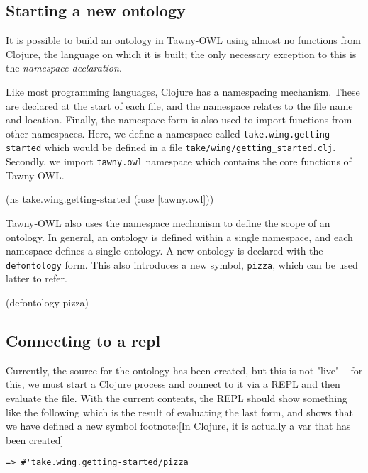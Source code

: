 \documentclass[11pt]{article}
\begin{document}
\subsection{Starting a new ontology}
\label{sec-4-2}

It is possible to build an ontology in Tawny-OWL using almost no
functions from Clojure, the language on which it is built; the only
necessary exception to this is the \emph{namespace declaration}.

Like most programming languages, Clojure has a namespacing mechanism.
These are declared at the start of each file, and the namespace relates
to the file name and location. Finally, the namespace form is also used
to import functions from other namespaces. Here, we define a namespace
called \texttt{take.wing.getting-started} which would be defined in a file
\texttt{take/wing/getting\_started.clj}. Secondly, we import \texttt{tawny.owl}
namespace which contains the core functions of Tawny-OWL.

\begin{tawny}
(ns take.wing.getting-started (:use [tawny.owl]))
\end{tawny}

Tawny-OWL also uses the namespace mechanism to define the scope of an
ontology. In general, an ontology is defined within a single namespace,
and each namespace defines a single ontology. A new ontology is declared
with the \texttt{defontology} form. This also introduces a new symbol, \texttt{pizza},
which can be used latter to refer.

\begin{tawny}
(defontology pizza)
\end{tawny}


\subsection{Connecting to a repl}
\label{sec-4-3}

Currently, the source for the ontology has been created, but this is not
"live" -- for this, we must start a Clojure process and connect to it
via a REPL and then evaluate the file. With the current contents, the
REPL should show something like the following which is the result of
evaluating the last form, and shows that we have defined a new symbol
footnote:[In Clojure, it is actually a var that has been created]

\begin{verbatim}
=> #'take.wing.getting-started/pizza
\end{verbatim}
\end{document}
